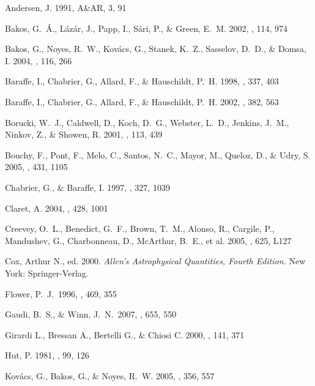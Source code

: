 \documentclass[12pt, preprint]{aastex}
\begin{document}
\begin{thebibliography}{}

Andersen, J. 1991, A\&AR, 3, 91

Bakos, G.\ {\'A}., L{\'a}z{\'a}r, J., Papp, I., S{\'a}ri, P., \& Green,
E.\ M.
2002, \pasp, 114, 974

Bakos, G., Noyes, R.\ W., Kov\'{a}cs, G., Stanek, K.\ Z., Sasselov,
D.\ D., \& Domsa, I.
2004, \pasp, 116, 266 

Baraffe, I., Chabrier, G., Allard, F., \& Hauschildt, P.\ H. 
1998, \aap, 337, 403

Baraffe, I., Chabrier, G., Allard, F., \& Hauschildt, P.\ H.
2002, \aap, 382, 563 

Borucki, W.\ J., Caldwell, D., Koch, D.\ G., Webster, L.\ D., Jenkins,
J.\ M., Ninkov, Z., \& Showen, R.
2001, \pasp, 113, 439

Bouchy, F., Pont, F., Melo, C., Santos, N.\ C., Mayor, M., Queloz, D.,
\& Udry, S.
2005, \aap, 431, 1105 

Chabrier, G., \& Baraffe, I.
1997, \aap, 327, 1039 

Claret, A.
2004, \aap, 428, 1001 

Creevey, O.\ L., Benedict, G.\ F., Brown, T.\ M., Alonso, R., Cargile, P., 
Mandushev, G., Charbonneau, D., McArthur, B.\ E., et al.
2005, \apj, 625, L127 

Cox, Arthur N., ed. 2000. \emph{Allen's Astrophysical Quantities, Fourth Edition.} New York: Springer-Verlag. 

 Flower, P.~J.\ 1996, \apj, 469, 
355 

 Gaudi, B.~S., \& Winn, 
J.~N.\ 2007, \apj, 655, 550 

Girardi L., Bressan A., Bertelli G., \& Chiosi C.
2000, \aaps, 141, 371

Hut, P.
1981, \aap, 99, 126

Kov{\'a}cs, G., Bakos, G., \& Noyes, R.\ W.
2005, \mnras, 356, 557


\end{thebibliography}
\end{document}
